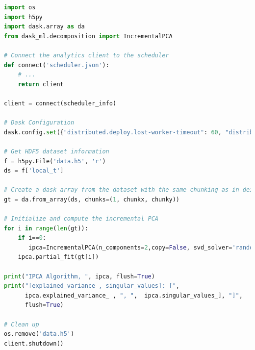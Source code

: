 \begin{lstlisting}[float=h!, label=list:daskanalyse, language=python, caption= Dask IPCA code]
import os
import h5py
import dask.array as da
from dask_ml.decomposition import IncrementalPCA

# Connect the analytics client to the scheduler
def connect('scheduler.json'):
    # ...
    return client

client = connect(scheduler_info)

# Dask Configuration 
dask.config.set({"distributed.deploy.lost-worker-timeout": 60, "distributed.workers.memory.spill":0.97, "distributed.workers.memory.target":0.95, "distributed.workers.memory.terminate":0.99 })

# Get HDF5 dataset information
f = h5py.File('data.h5', 'r') 
ds = f['local_t']

# Create a dask array from the dataset with the same chunking as in deisa 
gt = da.from_array(ds, chunks=(1, chunkx, chunky))

# Initialize and compute the incremental PCA
for i in range(len(gt)):
    if i==0:
       ipca=IncrementalPCA(n_components=2,copy=False, svd_solver='randomized') 
    ipca.partial_fit(gt[i])

print("IPCA Algorithm, ", ipca, flush=True)
print("[explained_variance , singular_values]: [", 
      ipca.explained_variance_ , ", ",  ipca.singular_values_], "]", 
      flush=True)

# Clean up    
os.remove('data.h5') 
client.shutdown()

\end{lstlisting}




